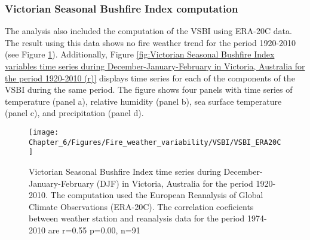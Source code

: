 \subsubsection{Victorian Seasonal Bushfire Index computation}

The analysis also included the computation of the VSBI using ERA-20C
data. The result using this data shows no fire weather trend for the
period 1920-2010 (see Figure \ref{fig:Victorian Seasonal Bushfire Index time series during December-January-February in Victoria, Australia for the period 1920-2010 (VSBI)}).
Additionally, Figure \ref{fig:Victorian Seasonal Bushfire Index variables time series during December-January-February in Victoria, Australia for the period 1920-2010 (r)}
displays time series for each of the components of the VSBI during
the same period. The figure shows four panels with time series of
temperature (panel a), relative humidity (panel b), sea surface temperature
(panel c), and precipitation (panel d). 

\clearpage

\begin{figure}[h]
\noindent \begin{centering}
\texttt{[image: Chapter\_6/Figures/Fire\_weather\_variability/VSBI/VSBI\_ERA20C]}
\par\end{centering}

\caption[Victorian Seasonal Bushfire Index time series during December-January-February
(DJF) in Victoria, Australia for the period 1920-2010]{Victorian Seasonal Bushfire Index time series during December-January-February
(DJF) in Victoria, Australia for the period 1920-2010. The computation
used the European Reanalysis of Global Climate Observations (ERA-20C).
The correlation coeficients between weather station and reanalysis
data for the period 1974-2010 are r=0.55 p=0.00, n=91 \label{fig:Victorian Seasonal Bushfire Index time series during December-January-February in Victoria, Australia for the period 1920-2010 (VSBI)} }
\end{figure}


